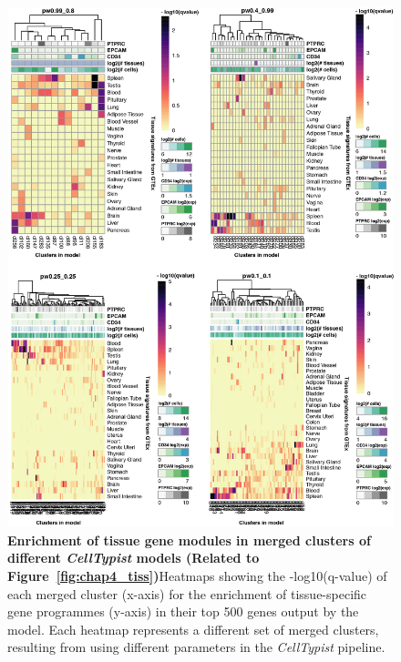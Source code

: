 \begin{figure}[ht!] 
\centering
\includegraphics[scale=0.77]{Appendix3/Figs/appB_clmGSEA.png} %
\caption[Enrichment of tissue gene modules in merged clusters of different \textit{CellTypist} models]{\textbf{Enrichment of tissue gene modules in merged clusters of different \textit{CellTypist} models (Related to Figure~\ref{fig:chap4_tiss})}\newline Heatmaps showing the -log10(q-value) of each merged cluster (x-axis) for the enrichment of tissue-specific gene programmes (y-axis) in their top 500 genes output by the model. Each heatmap represents a different set of merged clusters, resulting from using different parameters in the \textit{CellTypist} pipeline.}
\label{fig:appB_clmGSEA}
\end{figure}


